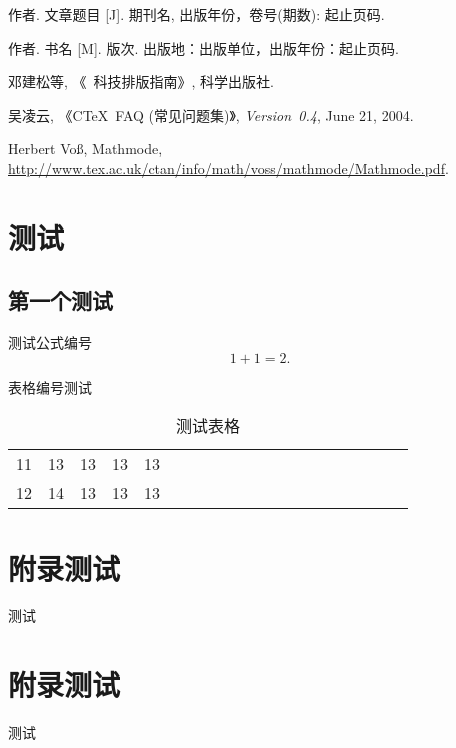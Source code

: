 \documentclass[forprint]{WHUBachelor}
\begin{document}

\cleardoublepage{}
{}
\begin{thebibliography}{00}

   作者. 文章题目 [J].  期刊名, 出版年份，卷号(期数): 起止页码.

   作者. 书名 [M]. 版次. 出版地：出版单位，出版年份：起止页码.

   邓建松等, 《\LaTeXe~科技排版指南》, 科学出版社.

   吴凌云, 《CTeX~FAQ (常见问题集)》, \textit{Version~0.4}, June 21, 2004.

   Herbert Vo\ss, Mathmode, \url{http://www.tex.ac.uk/ctan/info/math/voss/mathmode/Mathmode.pdf}.


\end{thebibliography}


\appendix

\chapter{测试}

\section{第一个测试}
测试公式编号
\begin{equation}
1+1=2.
\end{equation}

表格编号测试

\begin{table}[h]
  \centering
  \caption{测试表格}
  \begin{tabular}{*{20}c}
     \hline
     11 & 13  & 13  & 13  & 13 \\
     12 & 14  & 13  & 13  & 13 \\
     \hline
   \end{tabular}
\end{table}


\chapter{附录测试}

测试

\chapter{附录测试}

测试

\cleardoublepage
\end{document}
